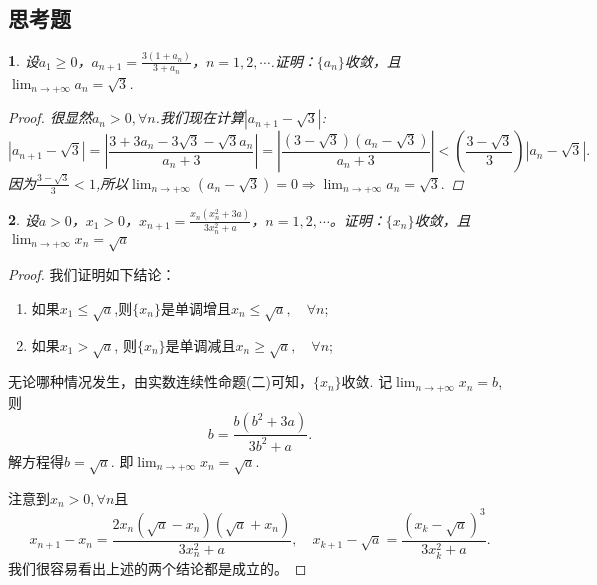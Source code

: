 \documentclass[utf8]{book}
\newtheorem{example}{}[section]             %
\begin{document}
\subsection{思考题}
\begin{example}
设$a_1\geq 0$，$a_{n+1} = \displaystyle\frac{3(1+a_n)}{3+a_n}$，$n=1,2,\cdots$.证明：$\{a_n\}$收敛，且$\displaystyle  \lim_{n\to +\infty}a_n=\sqrt{3}$.
\begin{proof}
很显然$a_n > 0, \forall n$.我们现在计算$\left|a_{n+1}-\sqrt{3}\right|$:
$$\left|a_{n+1}-\sqrt{3}\right| = \left|\frac{3+3a_n - 3\sqrt{3} -\sqrt{3}a_n}{a_n+3}\right|=\left|\frac{(3-\sqrt{3})(a_n-\sqrt{3})}{a_n+3}\right|<\left(\frac{3-\sqrt{3}}{3}\right)\left| a_n-\sqrt{3}\right|.$$
因为$\displaystyle \frac{3-\sqrt{3}}{3} < 1$,所以$\displaystyle  \lim_{n\to +\infty}(a_n-\sqrt{3})=0 \Rightarrow \displaystyle  \lim_{n\to +\infty}a_n=\sqrt{3}.$
\end{proof}
\end{example}
\begin{example}
设$a>0$，$x_1>0$，$x_{n+1} = \displaystyle\frac{x_n(x_n^2+3a)}{3x_n^2+a}$，$n=1,2,\cdots$。证明：$\{x_n\}$收敛，且$\displaystyle  \lim_{n\to +\infty}x_n=\sqrt{a}$
\end{example}
\begin{proof}我们证明如下结论：
\renewcommand\labelenumi{\normalfont(\theenumi)}
\begin{enumerate}
\item 如果$x_1\leq \sqrt{a}$,则$\{x_n\}$是单调增且$x_n\leq \sqrt{a}, \quad\forall n$;
\item 如果$x_1 > \sqrt{a}$, 则$\{x_n\}$是单调减且$x_n\geq\sqrt{a}, \quad\forall n$;
\end{enumerate}
无论哪种情况发生，由实数连续性命题(二)可知，$\{x_n\}$收敛. 记$\displaystyle  \lim_{n\to +\infty}x_n=b$, 则
$$b=\frac{b(b^2+3a)}{3b^2+a}.$$
解方程得$b=\sqrt{a}$. 即$\displaystyle  \lim_{n\to +\infty}x_n=\sqrt{a}$.

注意到$x_n > 0,\forall n$且
$$x_{n+1}-x_{n} = \frac{2x_n(\sqrt{a}-x_n)(\sqrt{a}+x_n)}{3x_n^2+a}, \quad x_{k+1} - \sqrt{a} = \displaystyle\frac{(x_{k}-\sqrt{a})^3}{3x_k^2+a}.$$
我们很容易看出上述的两个结论都是成立的。
\end{proof}
\end{document}
